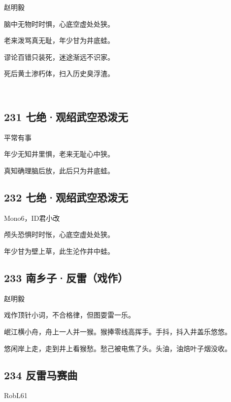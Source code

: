 {赵明毅}

脑中无物时时惧，心底空虚处处狭。

老来泼骂真无耻，年少甘为井底蛙。

谬论百错只装死，迷途渐远不识家。

死后黄土渗朽体，扫入历史臭浮渣。

~\\

\hypertarget{ux4e03ux7eddux89c2ux7ecdux6b66ux7a7aux6050ux6cfcux65e0}{%
\subsection{231
七绝·观绍武空恐泼无}\label{ux4e03ux7eddux89c2ux7ecdux6b66ux7a7aux6050ux6cfcux65e0}}

{平常有事}

年少无知井里惧，老来无耻心中狭。

真知确理脑后放，此后只为井底蛙。

\hypertarget{ux4e03ux7eddux89c2ux7ecdux6b66ux7a7aux6050ux6cfcux65e0-1}{%
\subsection{232
七绝·观绍武空恐泼无}\label{ux4e03ux7eddux89c2ux7ecdux6b66ux7a7aux6050ux6cfcux65e0-1}}

{Mono6，ID君小改}

颅头恐惧时时怅，心底空虚处处狭。

年少甘为壁上草，此生沦作井中蛙。

\hypertarget{ux5357ux4e61ux5b50ux53cdux96f7ux620fux4f5c}{%
\subsection{233
南乡子·反雷（戏作）}\label{ux5357ux4e61ux5b50ux53cdux96f7ux620fux4f5c}}

{赵明毅}

戏作顶针小词，不合格律，但图耍雷一乐。

岷江横小舟，舟上一人并一猴。猴捧零线高挥手。手抖，抖入井盖乐悠悠。

悠闲岸上走，走到井上看猴愁。愁己被电焦了头。头油，油焙叶子烟没收。

\hypertarget{ux53cdux96f7ux9a6cux8d5bux66f2}{%
\subsection{234 反雷马赛曲}\label{ux53cdux96f7ux9a6cux8d5bux66f2}}

{RobL61}


